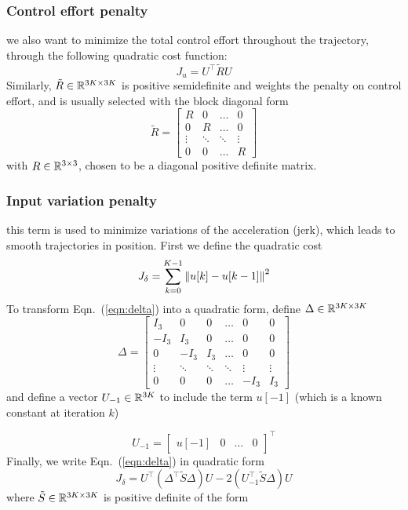 \subsubsection{Control effort penalty}
we also want to minimize the total control effort throughout the trajectory, through the following quadratic cost function:
\begin{equation}
\label{eqn:input}
J_u = U^\top \tilde{R} U 
\end{equation}
Similarly, $\tilde{R} \in {\mathbb R}^{3K \times 3K} $ is positive semidefinite and weights the penalty on control effort, and is usually selected with the block diagonal form
\begin{equation}
\tilde{R} = \begin{bmatrix}
R & 0& \ldots & 0 \\
0 & R & \ldots & 0 \\
\vdots & \ddots & \ddots & \vdots \\
0 & 0 & \ldots & R
\end{bmatrix}
\end{equation}
with $R \in {\mathbb R}^{3 \times 3}$, chosen to be a diagonal positive definite matrix.

\subsubsection{Input variation penalty}
this term is used to minimize variations of the acceleration (jerk), which leads to smooth trajectories in position. First we define the quadratic cost
\begin{equation}
\label{eqn:delta}
J_\delta = \sum_{k=0}^{K-1}\left\Vert u[k]-u[k-1]\right\Vert^2
\end{equation}
To transform Eqn.~(\ref{eqn:delta}) into a quadratic form, define $\Delta \in {\mathbb R}^{3K \times 3K}$
\begin{equation}
\Delta = \begin{bmatrix}
I_3 & 0 & 0 & \ldots & 0 & 0 \\
-I_3 & I_3 & 0 & \dots & 0 & 0 \\
0 & -I_3 & I_3 & \ldots & 0 & 0 \\
\vdots & \ddots & \ddots & \ddots & \vdots & \vdots\\
0& 0 & 0 & \ldots & -I_3 & I_3
\end{bmatrix}
\end{equation}
and define a vector $U_{-1} \in {\mathbb R}^{3K}$ to include the term $u[-1]$ (which is a known constant at iteration $k$)

\begin{equation}
U_{-1} = \begin{bmatrix}
u[-1] & 0 & \ldots & 0
\end{bmatrix}^\top
\end{equation}
Finally, we write Eqn.~(\ref{eqn:delta}) in quadratic form
\begin{equation}
\label{eqn:var}
J_\delta = U^\top (\Delta^\top \tilde{S} \Delta) U - 2(U_{-1}^\top \tilde{S} \Delta )U
\end{equation}	
where $\tilde{S} \in {\mathbb R}^{3K \times 3K}$ is positive definite of the form

